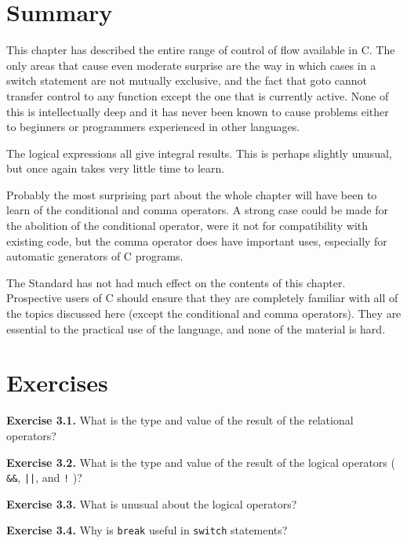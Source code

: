   

 
        \section{Summary}
        


  This chapter has described the entire range of control of flow available
   in C. The only areas that cause even moderate surprise are the way in which
   cases in a switch statement are not mutually exclusive, and the fact that
   goto cannot transfer control to any function except the one that is
   currently active. None of this is intellectually deep and it has never been
   known to cause problems either to beginners or programmers experienced in
   other languages.


  The logical expressions all give integral results. This is perhaps
   slightly unusual, but once again takes very little time to learn.


  Probably the most surprising part about the whole chapter will have been
   to learn of the conditional and comma operators. A strong case could be
   made for the abolition of the conditional operator, were it not for
   compatibility with existing code, but the comma operator does have
   important uses, especially for automatic generators of C programs.


  The Standard has not had much effect on the contents of this chapter.
   Prospective users of C should ensure that they are completely familiar with
   all of the topics discussed here (except the conditional and comma
   operators). They are essential to the practical use of the language, and
   none of the material is hard.


 
        \section{Exercises}
        

  \textbf{Exercise 3.1.} What is the type and value of the result of the
   relational operators?


  \textbf{Exercise 3.2.} What is the type and value of the result of the logical
   operators ( \texttt{\&\&}, \texttt{||}, and
   \texttt{!} )?


  \textbf{Exercise 3.3.} What is unusual about the logical operators?


  \textbf{Exercise 3.4.} Why is \texttt{break} useful in \texttt{switch}
   statements?



